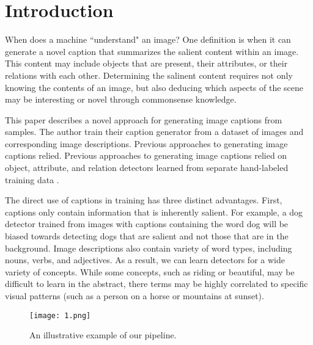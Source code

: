 \documentclass[10pt,twocolumn,letterpaper]{article}
\begin{document}
\section{Introduction}
When does a machine ``understand" an image? One definition is when it can generate a novel caption that summarizes the salient content within an image. This content may include objects that are present, their attributes, or their relations with each other. Determining the salinent content requires not only knowing the contents of an image, but also deducing which aspects of the scene may be interesting or novel through commonsense knowledge\cite{Chen2014NEIL}.
\par
This paper describes a novel approach for generating image captions from samples. The author train their caption generator from a dataset of images and corresponding image descriptions. Previous approaches to generating image captions relied. Previous approaches to generating image captions relied on object, attribute, and relation detectors learned from separate hand-labeled training data \cite{Kulkarni2013Baby}.
\par
The direct use of captions in training has three distinct advantages. First, captions only contain information that is inherently salient. For example, a dog detector trained from images with captions containing the word dog will be biased towards detecting dogs that are salient and not those that are in the background. Image descriptions also contain variety of word types, including nouns, verbs, and adjectives. As a result, we can learn detectors for a wide variety of concepts. While some concepts, such as riding or beautiful, may be difficult to learn in the abstract, there terms may be highly correlated to specific visual patterns (such as a person on a horse or mountains at sunset).
\begin{figure}
\begin{center}
  \texttt{[image: 1.png]}\\
  \caption{An illustrative example of our pipeline.}\label{1}
\end{center}
\end{figure}
\end{document}
